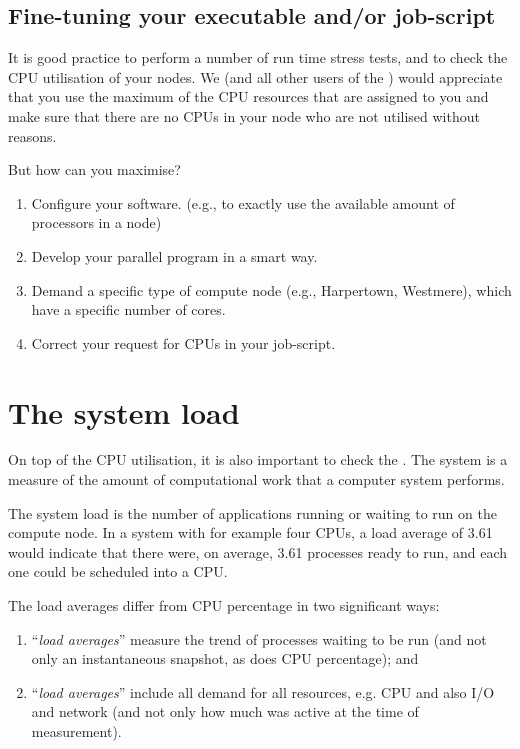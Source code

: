 \subsection{Fine-tuning your executable and/or job-script}

It is good practice to perform a number of run time stress tests, and to check
the CPU utilisation of your nodes. We (and all other users of the \hpc) would
appreciate that you use the maximum of the CPU resources that are assigned to
you and make sure that there are no CPUs in your node who are not utilised
without reasons.

But how can you maximise?

\begin{enumerate}
\item  Configure your software. (e.g., to exactly use the available amount of processors in a node)
\item  Develop your parallel program in a smart way.
\item  Demand a specific type of compute node (e.g., Harpertown, Westmere), which have a specific number of cores.
\item  Correct your request for CPUs in your job-script.
\end{enumerate}

\section{The system load}

On top of the CPU utilisation, it is also important to check the .  The system  is a measure of the amount of computational
work that a computer system performs.

The system load is the number of applications running or waiting to run on the
compute node.  In a system with for example four CPUs, a load average of 3.61
would indicate that there were, on average, 3.61 processes ready to run, and
each one could be scheduled into a CPU.

The load averages differ from CPU percentage in two significant ways:

\begin{enumerate}
\item  ``\emph{load averages}'' measure the trend of processes waiting to be run (and not only an instantaneous snapshot, as does CPU percentage); and
\item  ``\emph{load averages}'' include all demand for all resources, e.g. CPU and also I/O and network (and not only how much was active at the time of measurement).
\end{enumerate}


